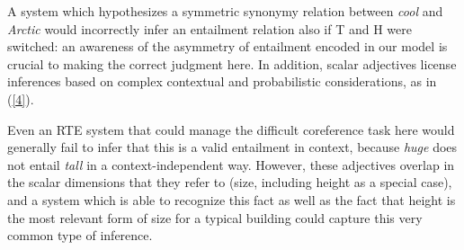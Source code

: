 \documentclass[10pt]{article}
\begin{document}

 \vspace{-.1in}
\noindent
A system which hypothesizes a symmetric synonymy relation between \emph{cool} and \emph{Arctic} would incorrectly infer an entailment relation also if T and H were switched: an awareness of the asymmetry of entailment encoded in our model is crucial to making the correct judgment here.
In addition, scalar adjectives license inferences based on complex contextual and probabilistic considerations, as in (\ref{4}).
 \vspace{-.1in}

 \vspace{-.1in}
Even an RTE system that could manage the difficult coreference task here would generally fail to infer that this is a valid entailment in context, because \emph{huge} does not entail \emph{tall} in a context-independent way. However, these adjectives overlap in the scalar dimensions that they refer to (size, including height as a special case), and a system which is able to recognize this fact as well as the fact that height is the most relevant form of size for a typical building could capture this very common type of inference. %
\end{document}
